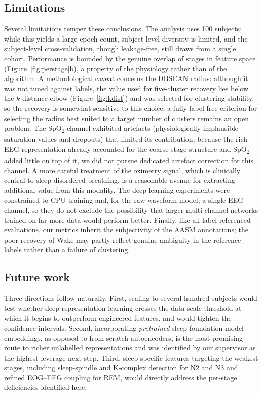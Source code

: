 \documentclass[11pt,a4paper]{article}
\begin{document}
\subsection{Limitations}
Several limitations temper these conclusions. The analysis uses 100 subjects;
while this yields a large epoch count, subject-level diversity is limited, and the
subject-level cross-validation, though leakage-free, still draws from a single
cohort. Performance is bounded by the genuine overlap of stages in feature space
(Figure~\ref{fig:perstage}b), a property of the physiology rather than of the
algorithm. A methodological caveat concerns the DBSCAN radius: although it was not
tuned against labels, the value used for five-cluster recovery lies below the
$k$-distance elbow (Figure~\ref{fig:kdist}) and was selected for clustering
stability, so the recovery is somewhat sensitive to this choice; a fully
label-free criterion for selecting the radius best suited to a target number of
clusters remains an open problem. The SpO\textsubscript{2} channel exhibited artefacts (physiologically implausible
saturation values and dropouts) that limited its contribution; because the rich
EEG representation already accounted for the coarse stage structure and
SpO\textsubscript{2} added little on top of it, we did not pursue dedicated
artefact correction for this channel. A more careful treatment of the oximetry
signal, which is clinically central to sleep-disordered breathing, is a reasonable
avenue for extracting additional value from this modality. The deep-learning experiments were constrained to CPU training and,
for the raw-waveform model, a single EEG channel, so they do not exclude the
possibility that larger multi-channel networks trained on far more data would
perform better. Finally, like all label-referenced evaluations, our metrics inherit
the subjectivity of the AASM annotations; the poor recovery of Wake may partly
reflect genuine ambiguity in the reference labels rather than a failure of
clustering.

\subsection{Future work}
Three directions follow naturally. First, scaling to several hundred subjects would
test whether deep representation learning crosses the data-scale threshold at which
it begins to outperform engineered features, and would tighten the confidence
intervals. Second, incorporating \emph{pretrained} sleep foundation-model
embeddings, as opposed to from-scratch autoencoders, is the most promising route to
richer unlabelled representations and was identified by our supervisor as the
highest-leverage next step. Third, sleep-specific features targeting the weakest
stages, including sleep-spindle and K-complex detection for N2 and N3 and refined
EOG--EEG coupling for REM, would directly address the per-stage deficiencies
identified here.
\end{document}
